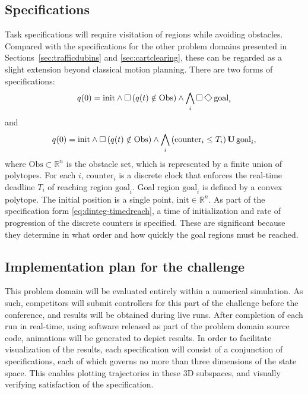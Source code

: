 \documentclass{amsart}
\theoremstyle{definition}
\begin{document}
\subsection{Specifications}

Task specifications will require visitation of regions while avoiding obstacles.
Compared with the specifications for the other problem domains presented in
Sections~\ref{sec:trafficdubins} and \ref{sec:cartclearing}, these can be
regarded as a slight extension beyond classical motion planning.  There are two
forms of specifications:
\begin{equation}\label{eq:dinteg-surveillance}
q(0) = \mathrm{init} \wedge \Galways \left( q(t) \notin \mathrm{Obs} \right) \wedge \bigwedge_{i} \Galways \Feventually \mathrm{goal}_i
\end{equation}
and
\begin{equation}\label{eq:dinteg-timedreach}
q(0) = \mathrm{init} \wedge \operatorname{\Box} \left( q(t) \notin \mathrm{Obs} \right) \wedge \bigwedge_{i} \left( \mathrm{counter}_i \leq T_{i} \right) \operatorname{\mathbf{U}} \mathrm{goal}_i ,
\end{equation}
where $\mathrm{Obs} \subset \mathbb{R}^n$ is the obstacle set, which is
represented by a finite union of polytopes.  For each $i$, $\mathrm{counter}_i$
is a discrete clock that enforces the real-time deadline $T_i$ of reaching
region $\mathrm{goal}_i$.  Goal region $\mathrm{goal}_i$ is defined by a convex
polytope.  The initial position is a single point, $\mathrm{init}\in
\mathbb{R}^n$.  As part of the specification form \eqref{eq:dinteg-timedreach},
a time of initialization and rate of progression of the discrete counters is
specified.  These are significant because they determine in what order and how
quickly the goal regions must be reached.



\subsection{Implementation plan for the challenge}

This problem domain will be evaluated entirely within a numerical simulation.
As such, competitors will submit controllers for this part of the challenge
before the conference, and results will be obtained during live runs.
After completion of each run in real-time, using software released as part of
the problem domain source code, animations will be generated to depict results.
In order to facilitate visualization of the results, each specification will consist 
of a conjunction of specifications, each of which governs no more than three 
dimensions of the state space. This enables plotting trajectories in these 3D 
subspaces, and visually verifying satisfaction of the specification. 
\end{document}

